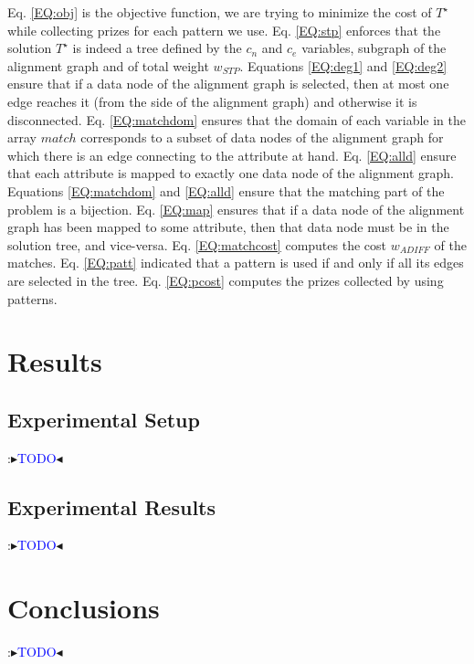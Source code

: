\documentclass[letterpaper]{article} %
\newcommand{\authornote}[3]{
  {\fbox{\sc 
  #1}:$\blacktriangleright$\textcolor{#2}{\small{#3}}$\blacktriangleleft$}%
}
\newcommand{\ddg}[1]{\authornote{DDG}{blue}{#1}}
\begin{document}
Eq. \ref{EQ:obj} is the objective function, we are trying to minimize the cost 
of $T^\star$ while collecting prizes for each pattern we use. Eq. \ref{EQ:stp} 
enforces that the solution 
$T^\star$ is indeed a tree defined by the $c_n$ and $c_e$ variables, subgraph 
of the alignment graph 
and of total weight $w_{STP}$. Equations \ref{EQ:deg1} and \ref{EQ:deg2} ensure 
that if a data node of the alignment graph is selected, then at most one edge 
reaches it (from the side of the alignment graph) and otherwise it is 
disconnected. Eq. \ref{EQ:matchdom} ensures that the domain of each variable in 
the array $match$ corresponds to a subset of data nodes of the alignment graph 
for which there is an edge connecting to the attribute at hand. Eq. 
\ref{EQ:alld} ensure that each attribute is mapped to exactly one data node of 
the alignment graph. Equations \ref{EQ:matchdom} and \ref{EQ:alld} ensure that 
the matching part of the problem is a bijection. Eq. \ref{EQ:map} ensures that 
if a data node of the alignment graph has been mapped to some attribute, then 
that data node must be in the solution tree, and vice-versa. Eq. 
\ref{EQ:matchcost} computes the cost $w_{ADIFF}$ of the matches.
Eq. \ref{EQ:patt} indicated that a pattern is used if and only if all its edges 
are selected in the tree. Eq. \ref{EQ:pcost} computes the prizes collected by 
using patterns.

\section{Results}

\subsection{Experimental Setup}
\ddg{TODO}

\subsection{Experimental Results}
\ddg{TODO}

\section{Conclusions}
\ddg{TODO} 




\end{document}
